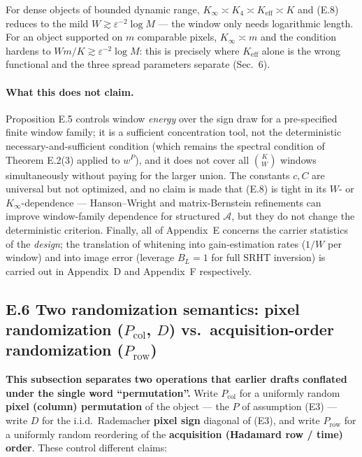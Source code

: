 For dense objects of bounded dynamic range, $K_\infty\asymp K_4\asymp K_{\mathrm{eff}}\asymp K$ and (E.8) reduces to the mild $W\gtrsim\varepsilon^{-2}\log M$ --- the window only needs logarithmic length. For an object supported on $m$ comparable pixels, $K_\infty\asymp m$ and the condition hardens to $Wm/K\gtrsim\varepsilon^{-2}\log M$: this is precisely where $K_{\mathrm{eff}}$ alone is the wrong functional and the three spread parameters separate (Sec.~6).

\paragraph{What this does not claim.} Proposition E.5 controls window \emph{energy} over the sign draw for a pre-specified finite window family; it is a sufficient concentration tool, not the deterministic necessary-and-sufficient condition (which remains the spectral condition of Theorem E.2(3) applied to $w^P$), and it does not cover all $\binom{K}{W}$ windows simultaneously without paying for the larger union. The constants $c,C$ are universal but not optimized, and no claim is made that (E.8) is tight in its $W$- or $K_\infty$-dependence --- Hanson--Wright and matrix-Bernstein refinements can improve window-family dependence for structured $\mathcal{A}$, but they do not change the deterministic criterion. Finally, all of Appendix~E concerns the carrier statistics of the \emph{design}; the translation of whitening into gain-estimation rates ($1/W$ per window) and into image error (leverage $B_L=1$ for full SRHT inversion) is carried out in Appendix~D and Appendix~F respectively.

\subsection{E.6 Two randomization semantics: pixel randomization (\texorpdfstring{$P_{\mathrm{col}}$}{Pcol}, \texorpdfstring{$D$}{D}) vs.\ acquisition-order randomization (\texorpdfstring{$P_{\mathrm{row}}$}{Prow})}

\textbf{This subsection separates two operations that earlier drafts conflated under the single word ``permutation''.} Write $P_{\mathrm{col}}$ for a uniformly random \textbf{pixel (column) permutation} of the object --- the $P$ of assumption (E3) --- write $D$ for the i.i.d.\ Rademacher \textbf{pixel sign} diagonal of (E3), and write $P_{\mathrm{row}}$ for a uniformly random reordering of the \textbf{acquisition (Hadamard row / time) order}. These control different claims:

